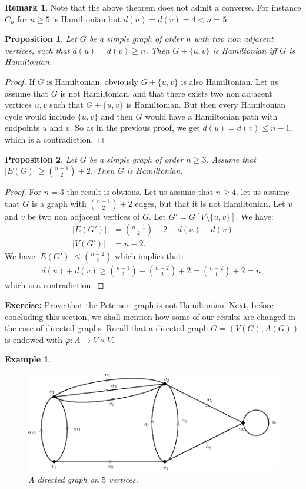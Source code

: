 \documentclass[12pt,a4paper]{article}
\newtheorem{prop}{Proposition}[section]
\newtheorem{exmp}{Example}[section]
\theoremstyle{definition}
\newtheorem{rem}{Remark}[section]
\begin{document}
\begin{rem}Note that the above theorem does not admit a converse. For instance $C_n$ for $n \geq 5$ is Hamiltonian but $d(u)= d(v)=4 < n =5$.
\end{rem}
\begin{prop} Let $G$ be a simple graph of order $n$ with two non adjacent vertices, such that $d(u)=d(v) \geq n$. Then $G+\{u,v\}$ is Hamiltonian iff $G$ is Hamiltonian. 
\end{prop}
\begin{proof}
If $G$ is Hamiltonian, obviously $G+\{u,v\}$ is also Hamiltonian. Let us assume that $G$ is not Hamiltonian. and that there exists two non adjacent vertices $u,v$ such that $G+\{u,v\}$ is Hamiltonian. But then every Hamiltonian cycle would include $\{u,v\}$ and then $G$ would have a Hamiltonian path with endpoints $u$ and $v$. So as in the previous proof, we get $d(u)=d(v) \leq n-1$, which is a contradiction. 
\end{proof}
\begin{prop} Let $G$ be a simple graph of order $n \geq 3$. Assume that $|E(G)| \geq {n-1 \choose 2}+2$. Then $G$ is Hamiltonian. 
\end{prop}
\begin{proof}
For $n=3$ the result is obvious. Let us assume that $n \geq 4$. let us assume that $G$ is a graph with ${ n-1 \choose 2} +2$ edges, but that it is not Hamiltonian. Let $u$ and $v$ be two non adjacent vertices of $G$. Let $G'= G[V \setminus \{u,v\}]$. We have:
\begin{align*}
|E(G')| &= { n-1 \choose 2} + 2 -d(u)-d(v) \\
|V(G')| &=n-2.
\end{align*}
We have $|E(G')| \leq { n-2 \choose 2}$ which implies that:
\begin{align*}
d(u)+d(v) \geq { n-1 \choose 2 } - { n-2 \choose 2} + 2 = {n-2 \choose 1 } + 2 = n,
\end{align*}
which is a contradiction. 
\end{proof}
\textbf{Exercise:} Prove that the Petersen graph is not Hamiltonian. 
\newpage
Next, before concluding this section, we shall mention how some of our results are changed in the case of directed graphs. Recall that a directed graph $G=(V(G),A(G))$ is endowed with $\varphi :A \to V \times V$. 
\begin{exmp} \
\begin{figure}[hbtp]
\centering
\includegraphics[scale=.9]{images/graph37.pdf}
\caption{A directed graph on $5$ vertices.}
\end{figure}
\end{exmp}
\end{document}
